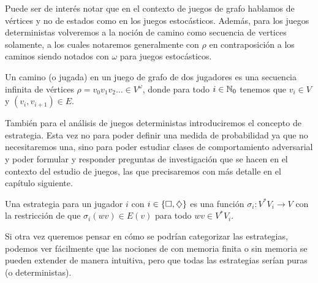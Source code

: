 Puede ser de interés notar que en el contexto de juegos de grafo hablamos de
vértices y no de estados como en los juegos estocásticos. Además, para los
juegos deterministas volveremos a la noción de camino como secuencia de
vertices solamente, a los cuales notaremos generalmente con $\rho$ en
contraposición a los caminos siendo notados con $\omega$ para juegos
estocásticos.

\begin{definition}
	Un camino (o jugada) en un juego de grafo de dos jugadores es una secuencia infinita de vértices $\rho = v_0v_1v_2 \dots \in V^\omega$, donde para todo $i \in \mathbb{N}_0$ tenemos que $v_i \in V$ y $(v_i, v_{i+1}) \in E$.

\end{definition}

También para el análisis de juegos deterministas introduciremos el concepto de
estrategia. Esta vez no para poder definir una medida de probabilidad ya que no
necesitaremos una, sino para poder estudiar clases de comportamiento
adversarial y poder formular y responder preguntas de investigación que se
hacen en el contexto del estudio de juegos, las que precisaremos con más
detalle en el capítulo siguiente.


\begin{definition}
	Una estrategia para un jugador $i$ con $i \in \{\square, \diamondsuit\}$ es una función $\sigma_i: V^*V_i \rightarrow V$ con la restricción de que $\sigma_i(wv) \in E(v)$ para todo $wv \in V^*V_i$.
\end{definition}

Si otra vez queremos pensar en cómo se podrían categorizar las estrategias,
podemos ver fácilmente que las nociones de con memoria finita o sin memoria se
pueden extender de manera intuitiva, pero que todas las estrategias serían
puras (o deterministas).


